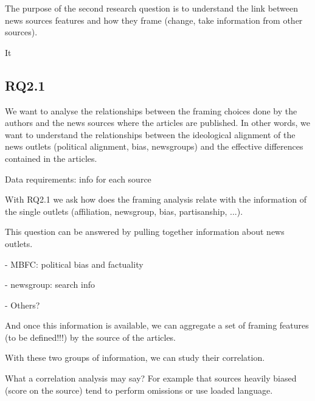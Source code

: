 The purpose of the second research question is to understand the link between news sources features and how they frame (change, take information from other sources).

It 

\subsection{RQ2.1}
We want to analyse the relationships between the framing choices done by the authors and the news sources where the articles are published. In other words, we want to understand the relationships between the ideological alignment of the news outlets (political alignment, bias, newsgroups) and the effective differences contained in the articles.

Data requirements: info for each source




With RQ2.1 we ask how does the framing analysis relate with the information of the single outlets (affiliation, newsgroup, bias, partisanship, ...).


This question can be answered by pulling together information about news outlets.

- MBFC: political bias and factuality

- newsgroup: search info

- Others?

And once this information is available, we can aggregate a set of framing features (to be defined!!!) by the source of the articles.

With these two groups of information, we can study their correlation.

What a correlation analysis may say? For example that sources heavily biased (score on the source) tend to perform omissions or use loaded language.




